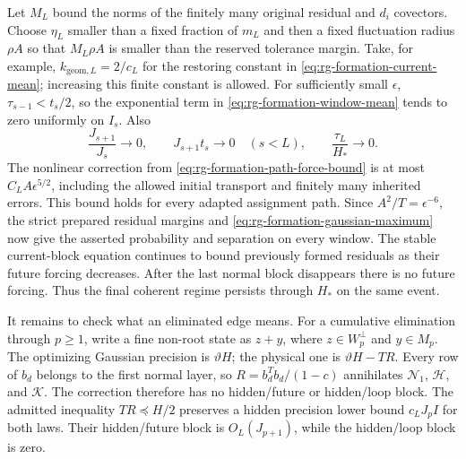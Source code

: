 Let $M_L$ bound the norms of the finitely many original residual
and $d_i$ covectors. Choose $\eta_L$ smaller than a fixed fraction
of $m_L$ and then a fixed fluctuation radius $\rho A$ so that
$M_L\rho A$ is smaller than the reserved tolerance margin.
Take, for example, $k_{\mathrm{geom},L}=2/c_L$ for the restoring
constant in \cref{eq:rg-formation-current-mean}; increasing this
finite constant is allowed. For sufficiently small $\epsilon$,
$\tau_{s-1}<t_s/2$, so the exponential term in
\cref{eq:rg-formation-window-mean} tends to zero uniformly on
$I_s$. Also
\begin{equation}
 \frac{J_{s+1}}{J_s}\longrightarrow0,
 \qquad J_{s+1}t_s\longrightarrow0\quad(s<L),
 \qquad \frac{\tau_L}{H_*}\longrightarrow0.
 \label{eq:rg-formation-geometric-entrance}
\end{equation}
The nonlinear correction from
\cref{eq:rg-formation-path-force-bound} is at most
$C_LA\epsilon^{5/2}$, including the allowed initial transport and
finitely many inherited errors. This bound holds for every adapted
assignment path. Since $A^2/T=\epsilon^{-6}$, the strict prepared
residual margins and \cref{eq:rg-formation-gaussian-maximum} now
give the asserted probability and separation on every window.
The stable current-block equation continues to bound previously
formed residuals as their future forcing decreases. After the last
normal block disappears there is no future forcing. Thus the final
coherent regime persists through $H_*$ on the same event.

It remains to check what an eliminated edge means. For a cumulative
elimination through $p\ge1$, write a fine non-root state as $z+y$,
where $z\in W_p^\perp$ and $y\in M_p$. The optimizing Gaussian
precision is $\vartheta H$; the physical one is
$\vartheta H-TR$. Every row of $b_d$ belongs to the first normal
layer, so $R=b_d^Tb_d/(1-c)$ annihilates $\mathcal N_1$,
$\mathcal H$, and $\mathcal K$. The correction therefore has no
hidden/future or hidden/loop block. The admitted inequality
$TR\preceq H/2$ preserves a hidden precision lower bound
$c_LJ_pI$ for both laws. Their hidden/future block is
$O_L(J_{p+1})$, while the hidden/loop block is zero.

